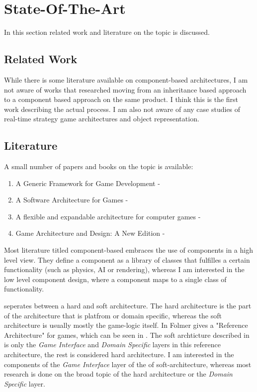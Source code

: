 \section{State-Of-The-Art}
In this section related work and literature on the topic is discussed.

\subsection{Related Work}
While there is some literature available on component-based architectures, I am not aware of works that researched
moving from an inheritance based approach to a component based approach on the same product. I think this is the first
work describing the actual process. I am also not aware of any case studies of \OS{} real-time strategy game
architectures and object representation.

\subsection{Literature}
A small number of papers and books on the topic is available:
\begin{enumerate}
    \item A Generic Framework for Game Development - \cite{Fh02ageneric}
    \item A Software Architecture for Games - \cite{Doherty_2003}
    \item A flexible and expandable architecture for computer games - \cite{Plummer_2004}
    \item Game Architecture and Design: A New Edition - \cite{Rollings.2003}
\end{enumerate}

Most literature titled component-based embraces the use of components in a high level view. They define a component
as a library of classes that fulfilles a certain functionality (such as physics, AI or rendering), whereas I am
interested in the low level component design, where a component maps to a single class of functionality.

\cite{Rollings.2003} seperates between a hard and soft architecture. The hard architecture is the part of the
architecture that is platfrom or domain specific, whereas the soft architecture is usually mostly the game-logic itself.
In \cite{springerlink:10.1007/978-3-540-73551-95} Folmer gives a "Reference Architecture" for games, which can be seen in
. The soft archticture described in \cite{Rollings.2003} is only the \textit{Game Interface}
and \textit{Domain Specific} layers in this reference architecture, the rest is considered hard architecture. I am
interested in the components of the \textit{Game Interface} layer of the of soft-architecture, whereas most
research is done on the broad topic of the hard architecture or the \textit{Domain Specific} layer.

